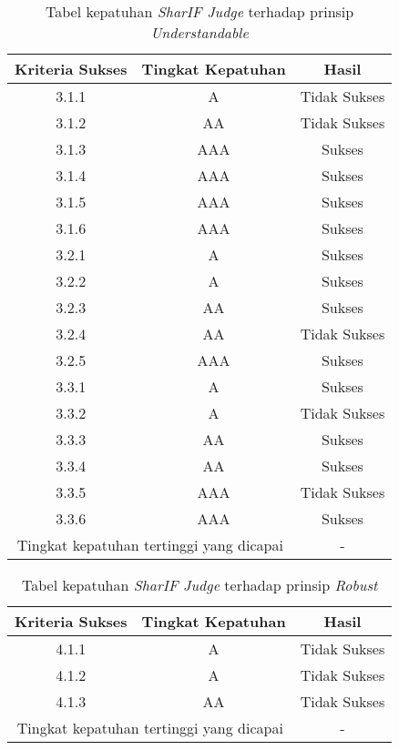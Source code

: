 \begin{table}[H]
	\centering
	\caption{Tabel kepatuhan \textit{SharIF Judge} terhadap prinsip \textit{Understandable}}
	\label{tab:kepatuhan_sharif_judge_understandable}
	\begin{tabular}{|c|c|c|}
		\hline
		Kriteria Sukses & Tingkat Kepatuhan & Hasil\\
		\hline
		\rowcolor{Pink} 3.1.1 & A & Tidak Sukses\\
		\rowcolor{LightRed} 3.1.2 & AA & Tidak Sukses\\
		3.1.3 & AAA& Sukses\\
		3.1.4 & AAA & Sukses\\
		3.1.5 & AAA & Sukses\\
		3.1.6 & AAA & Sukses\\
		3.2.1 & A & Sukses\\
		3.2.2 & A & Sukses\\
		3.2.3 & AA & Sukses\\
		\rowcolor{LightRed} 3.2.4 & AA & Tidak Sukses\\
		3.2.5 & AAA & Sukses\\
		3.3.1 & A & Sukses\\
		\rowcolor{Pink} 3.3.2 & A & Tidak Sukses\\
		3.3.3 & AA & Sukses\\
		3.3.4 & AA & Sukses\\
		\rowcolor{Red} 3.3.5 & AAA & Tidak Sukses\\
		3.3.6 & AAA & Sukses\\
		\hline
		\multicolumn{2}{|c|}{Tingkat kepatuhan tertinggi yang dicapai} & - \\
		\hline
	\end{tabular}
\end{table}

\begin{table}[H]
	\centering
	\caption{Tabel kepatuhan \textit{SharIF Judge} terhadap prinsip \textit{Robust}}
	\label{tab:kepatuhan_sharif_judge_robust}
	\begin{tabular}{|c|c|c|}
		\hline
		Kriteria Sukses & Tingkat Kepatuhan & Hasil\\
		\hline
		\rowcolor{Pink} 4.1.1 & A & Tidak Sukses\\
		\rowcolor{Pink} 4.1.2 & A & Tidak Sukses\\
		\rowcolor{LightRed} 4.1.3 & AA & Tidak Sukses\\
		\hline
		\multicolumn{2}{|c|}{Tingkat kepatuhan tertinggi yang dicapai} & - \\
		\hline
	\end{tabular}
\end{table}

